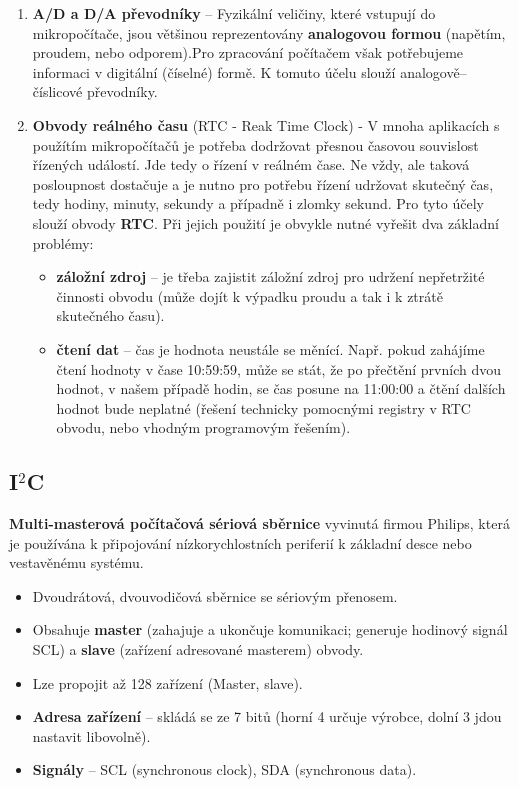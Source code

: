 \begin{enumerate}
\item \textbf{A/D a D/A převodníky} -- Fyzikální veličiny, které vstupují do mikropočítače, jsou většinou reprezentovány
\textbf{analogovou formou} (napětím, proudem, nebo odporem).Pro zpracování počítačem však potřebujeme informaci v digitální (číselné) formě. K tomuto účelu slouží analogově–číslicové převodníky.
\item \textbf{Obvody reálného času} (RTC - Reak Time Clock) - V mnoha aplikacích s použítím mikropočítačů je potřeba dodržovat přesnou časovou souvislost řízených událostí. Jde tedy o řízení v reálném čase. Ne vždy, ale taková posloupnost dostačuje a je nutno pro potřebu řízení udržovat skutečný čas, tedy hodiny, minuty, sekundy a případně i zlomky sekund. Pro tyto účely slouží obvody \textbf{RTC}. Při jejich použití je obvykle nutné vyřešit dva základní problémy:
\begin{itemize}
\item \textbf{záložní zdroj} -- je třeba zajistit záložní zdroj pro udržení nepřetržité činnosti obvodu (může dojít k výpadku proudu a tak i k ztrátě skutečného času).
\item \textbf{čtení dat} -- čas je hodnota neustále se měnící. Např. pokud zahájíme čtení hodnoty v čase 10:59:59, může se stát, že po přečtění prvních dvou hodnot, v našem případě hodin, se čas posune na 11:00:00 a čtění dalších hodnot bude neplatné (řešení technicky pomocnými registry v RTC obvodu, nebo vhodným programovým řešením). 
\end{itemize}
\end{enumerate}


\subsection{I$^2$C}
\textbf{Multi-masterová počítačová sériová sběrnice} vyvinutá firmou Philips, která je používána k připojování nízkorychlostních periferií k základní desce nebo vestavěnému systému.
\begin{itemize}
\item Dvoudrátová, dvouvodičová sběrnice se sériovým přenosem.
\item Obsahuje \textbf{master} (zahajuje a ukončuje komunikaci; generuje hodinový signál SCL) a \textbf{slave} (zařízení adresované masterem) obvody.
\item Lze propojit až 128 zařízení (Master, slave).
\item \textbf{Adresa zařízení} -- skládá se ze 7 bitů (horní 4 určuje výrobce, dolní 3 jdou nastavit libovolně).
\item \textbf{Signály} -- SCL (synchronous clock), SDA (synchronous data).
\end{itemize}